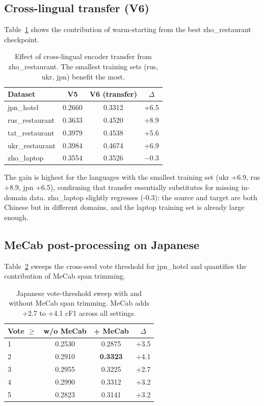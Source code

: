 \documentclass[11pt]{article}
\begin{document}
\subsection{Cross-lingual transfer (V6)}

Table~\ref{tab:transfer} shows the contribution of warm-starting from
the best zho\_restaurant checkpoint.

\begin{table}[h]
\centering\small
\begin{tabular}{lccc}
\toprule
Dataset & V5 & V6 (transfer) & $\Delta$ \\
\midrule
jpn\_hotel      & 0.2660 & 0.3312 & +6.5 \\
rus\_restaurant & 0.3633 & 0.4520 & +8.9 \\
tat\_restaurant & 0.3979 & 0.4538 & +5.6 \\
ukr\_restaurant & 0.3984 & 0.4674 & +6.9 \\
zho\_laptop     & 0.3554 & 0.3526 & $-$0.3 \\
\bottomrule
\end{tabular}
\caption{Effect of cross-lingual encoder transfer from
zho\_restaurant. The smallest training sets (rus, ukr, jpn) benefit
the most.}
\label{tab:transfer}
\end{table}

The gain is highest for the languages with the smallest training set
(ukr +6.9, rus +8.9, jpn +6.5), confirming that transfer essentially
substitutes for missing in-domain data. zho\_laptop slightly regresses
(-0.3): the source and target are both Chinese but in different
domains, and the laptop training set is already large enough.

\subsection{MeCab post-processing on Japanese}

Table~\ref{tab:jpnvote} sweeps the cross-seed vote threshold for
jpn\_hotel and quantifies the contribution of MeCab span trimming.

\begin{table}[h]
\centering\small
\begin{tabular}{lccc}
\toprule
Vote $\geq$ & w/o MeCab & + MeCab & $\Delta$ \\
\midrule
1 & 0.2530 & 0.2875 & +3.5 \\
2 & 0.2910 & \textbf{0.3323} & +4.1 \\
3 & 0.2955 & 0.3225 & +2.7 \\
4 & 0.2990 & 0.3312 & +3.2 \\
5 & 0.2823 & 0.3141 & +3.2 \\
\bottomrule
\end{tabular}
\caption{Japanese vote-threshold sweep with and without MeCab span
trimming. MeCab adds +2.7 to +4.1 cF1 across all settings.}
\label{tab:jpnvote}
\end{table}
\end{document}
